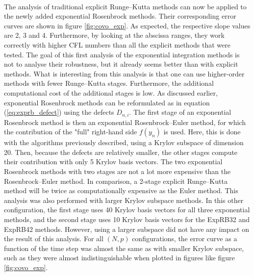       \paragraph{}
      The analysis of traditional explicit Runge--Kutta methods can now be applied to the newly added exponential Rosenbrock methods.
      Their corresponding error curves are shown in figure \ref{fig:covo_exp}.
      As expected, the respective slope values are 2, 3 and 4.
      Furthermore, by looking at the abscissa ranges, they work correctly with higher CFL numbers than all the explicit methods that were tested.
      The goal of this first analysis of the exponential integration methods is not to analyse their robustness, but it already seems better than with explicit methods.
      What is interesting from this analysis is that one can use higher-order methods with fewer Runge--Kutta stages.
      Furthermore, the additional computational cost of the additional stages is low.
      As discussed earlier, exponential Rosenbrock methods can be reformulated as in equation (\ref{eq:exprb_defect}) using the defects $D_{n, i}$.
      The first stage of an exponential Rosenbrock method is then an exponential Rosenbrock--Euler method, for which the contribution of the "full" right-hand side $f\left(y_n\right)$ is used.
      Here, this is done with the algorithms previously described, using a Krylov subspace of dimension 20.
      Then, because the defects are relatively smaller, the other stages compute their contribution with only 5 Krylov basis vectors.
      The two exponential Rosenbrock methods with two stages are not a lot more expensive than the Rosenbrock--Euler method.
      In comparison, a 2-stage explicit Runge--Kutta method will be twice as computationally expensive as the Euler method.
      This analysis was also performed with larger Krylov subspace methods.
      In this other configuration, the first stage uses 40 Krylov basis vectors for all three exponential methods, and the second stage uses 10 Krylov basis vectors for the ExpRB32 and ExpRB42 methods.
      However, using a larger subspace did not have any impact on the result of this analysis.
      For all $\left(N, p\right)$ configurations, the error curve as a function of the time step was almost the same as with smaller Krylov subspace, such as they were almost indistinguishable when plotted in figures like figure \ref{fig:covo_exp}.

